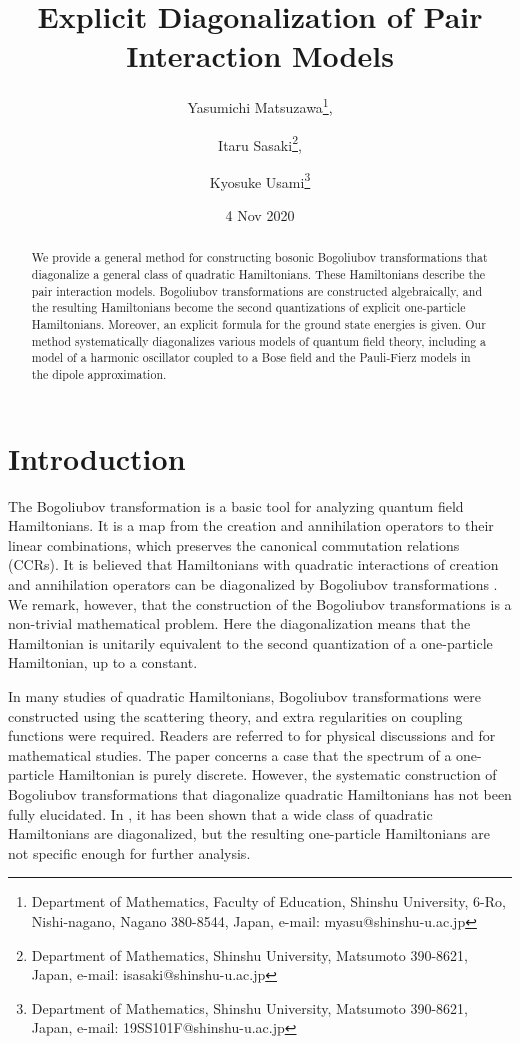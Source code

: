 \documentclass[12pt]{article}
\title{\sc Explicit Diagonalization of Pair Interaction Models}
\author{Yasumichi Matsuzawa\thanks{Department of Mathematics, Faculty of Education, Shinshu University,
        6-Ro, Nishi-nagano, Nagano 380-8544, Japan,
        e-mail: myasu@shinshu-u.ac.jp},
\and
        Itaru Sasaki\thanks{Department of Mathematics, Shinshu University, Matsumoto 390-8621, Japan, 
        e-mail: isasaki@shinshu-u.ac.jp},
\and 
        Kyosuke Usami\thanks{Department of Mathematics, Shinshu University, Matsumoto 390-8621, Japan,
        e-mail: 19SS101F@shinshu-u.ac.jp}
}
\date{4 Nov 2020}
\theoremstyle{plain}
\numberwithin{equation}{section}
\theoremstyle{remark}
\begin{document}
\maketitle       %



\begin{abstract}
We provide a general method for constructing bosonic Bogoliubov transformations that diagonalize
 a general class of quadratic Hamiltonians.
These Hamiltonians describe the pair interaction models.
Bogoliubov transformations are constructed algebraically, and the resulting Hamiltonians 
become the second quantizations of explicit one-particle Hamiltonians.
Moreover, an explicit formula for the ground state energies is given. 
Our method systematically diagonalizes various models of quantum field theory,
 including a model of a harmonic oscillator coupled to a Bose field and the Pauli-Fierz models
 in the dipole approximation.
\end{abstract}

\newpage
\tableofcontents %
\newpage

\section{Introduction}\label{intro}
The Bogoliubov transformation is a basic tool for analyzing quantum field Hamiltonians.
It is a map from the creation and annihilation operators 
to their linear combinations, which preserves the canonical commutation relations (CCRs).
It is believed that Hamiltonians with quadratic interactions of creation and annihilation
operators can be diagonalized by Bogoliubov transformations \cite{Be}.
We remark, however, that the construction of the Bogoliubov transformations is a non-trivial mathematical problem.
Here the diagonalization means that the Hamiltonian is unitarily equivalent to the second quantization of a one-particle Hamiltonian, 
up to a constant.

In many studies of quadratic Hamiltonians, Bogoliubov transformations were constructed using the scattering theory, 
and extra regularities on coupling functions were required.
Readers are referred to \cite{KM} for physical discussions and \cite{Ar81, A83, A83b, AF, EB} for mathematical studies.
The paper \cite{GS} concerns a case that the spectrum of a one-particle Hamiltonian is purely discrete.
However, the systematic construction of Bogoliubov transformations that diagonalize quadratic 
Hamiltonians has not been fully elucidated.
In \cite{De17,TNS}, it has been shown that a wide class of quadratic Hamiltonians are diagonalized, 
but the resulting one-particle Hamiltonians are not specific enough for further analysis.
\end{document}

